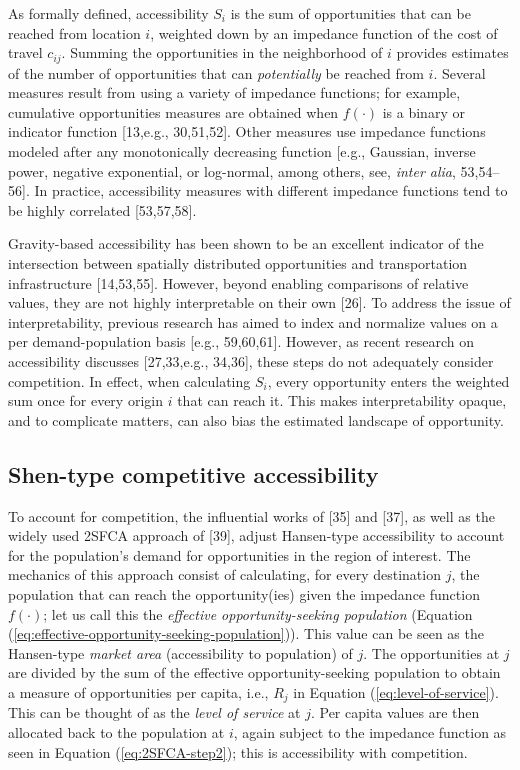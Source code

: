\documentclass[10pt,letterpaper]{article}
\begin{document}
As formally defined, accessibility \(S_i\) is the sum of opportunities
that can be reached from location \(i\), weighted down by an impedance
function of the cost of travel \(c_{ij}\). Summing the opportunities in
the neighborhood of \(i\) provides estimates of the number of
opportunities that can \emph{potentially} be reached from \(i\). Several
measures result from using a variety of impedance functions; for
example, cumulative opportunities measures are obtained when
\(f(\cdot)\) is a binary or indicator function {[}13,e.g., 30,51,52{]}.
Other measures use impedance functions modeled after any monotonically
decreasing function {[}e.g., Gaussian, inverse power, negative
exponential, or log-normal, among others, see, \emph{inter alia},
53,54--56{]}. In practice, accessibility measures with different
impedance functions tend to be highly correlated {[}53,57,58{]}.

Gravity-based accessibility has been shown to be an excellent indicator
of the intersection between spatially distributed opportunities and
transportation infrastructure {[}14,53,55{]}. However, beyond enabling
comparisons of relative values, they are not highly interpretable on
their own {[}26{]}. To address the issue of interpretability, previous
research has aimed to index and normalize values on a per
demand-population basis {[}e.g., 59,60,61{]}. However, as recent
research on accessibility discusses {[}27,33,e.g., 34,36{]}, these steps
do not adequately consider competition. In effect, when calculating
\(S_i\), every opportunity enters the weighted sum once for every origin
\(i\) that can reach it. This makes interpretability opaque, and to
complicate matters, can also bias the estimated landscape of
opportunity.

\hypertarget{shen-type-competitive-accessibility}{%
\subsection{Shen-type competitive
accessibility}\label{shen-type-competitive-accessibility}}

To account for competition, the influential works of {[}35{]} and
{[}37{]}, as well as the widely used 2SFCA approach of {[}39{]}, adjust
Hansen-type accessibility to account for the population's demand for
opportunities in the region of interest. The mechanics of this approach
consist of calculating, for every destination \(j\), the population that
can reach the opportunity(ies) given the impedance function
\(f(\cdot)\); let us call this the \emph{effective opportunity-seeking
population} (Equation
(\ref{eq:effective-opportunity-seeking-population})). This value can be
seen as the Hansen-type \emph{market area} (accessibility to population)
of \(j\). The opportunities at \(j\) are divided by the sum of the
effective opportunity-seeking population to obtain a measure of
opportunities per capita, i.e., \(R_j\) in Equation
(\ref{eq:level-of-service}). This can be thought of as the \emph{level
of service} at \(j\). Per capita values are then allocated back to the
population at \(i\), again subject to the impedance function as seen in
Equation (\ref{eq:2SFCA-step2}); this is accessibility with competition.
\end{document}
